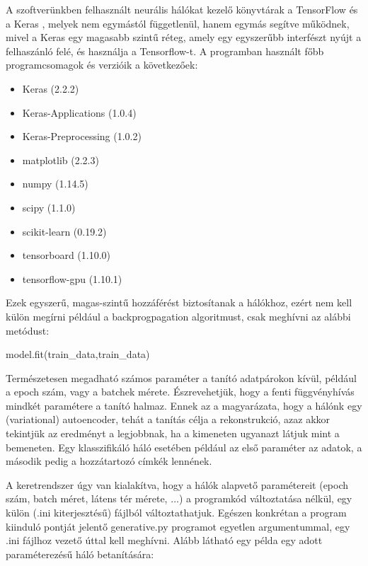 A szoftverünkben felhasznált neurális hálókat kezelő könyvtárak a TensorFlow \cite{tensorflow} és a Keras \cite{Keras}, melyek nem egymástól függetlenül, hanem egymás segítve működnek, mivel a Keras egy magasabb szintű réteg, amely egy egyszerűbb interfészt nyújt a felhaszánló felé, és használja a Tensorflow-t. A programban használt főbb programcsomagok és verzióik a következőek:

\begin{itemize}
  \item Keras (2.2.2)
  \item Keras-Applications (1.0.4)
  \item Keras-Preprocessing (1.0.2)
  \item matplotlib (2.2.3)
  \item numpy (1.14.5)
  \item scipy (1.1.0)
  \item scikit-learn (0.19.2)
  \item tensorboard (1.10.0)
  \item tensorflow-gpu (1.10.1)
\end{itemize}

Ezek egyszerű, magas-szintű hozzáférést biztosítanak a hálókhoz, ezért nem kell külön megírni például a backprogpagation algoritmust, csak meghívni az alábbi metódust:

\begin{python}
model.fit(train_data,train_data)
\end{python}

Természetesen megadható számos paraméter a tanító adatpárokon kívül, például a epoch szám, vagy a batchek mérete. Észrevehetjük, hogy a fenti függvényhívás mindkét paramétere a tanító halmaz. Ennek az a magyarázata, hogy a hálónk egy (variational) autoencoder, tehát a tanítás célja a rekonstrukció, azaz akkor tekintjük az eredményt a legjobbnak, ha a kimeneten ugyanazt látjuk mint a bemeneten. Egy klasszifikáló háló esetében például az első paraméter az adatok, a második pedig a hozzátartozó címkék lennének.

A keretrendszer úgy van kialakítva, hogy a hálók alapvető paramétereit (epoch szám, batch méret, látens tér mérete, $\dots$) a programkód változtatása nélkül, egy külön (.ini kiterjesztésű) fájlból változtathatjuk. Egészen konkrétan a program kiinduló pontját jelentő generative.py programot egyetlen argumentummal, egy .ini fájlhoz vezető úttal kell meghívni. Alább látható egy példa egy adott paraméterezésű háló betanítására:


